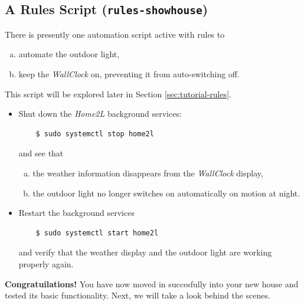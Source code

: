 \documentclass[12pt,english,parskip=half]{scrreprt}
\begin{document}
\subsection{A Rules Script (\texttt{rules-showhouse})}
\label{sec:tutorial-firststeps-rules}


There is presently one automation script active with rules to
\begin{enumerate}[a)]
\item
  automate the outdoor light,
\item
  keep the \emph{WallClock} on, preventing it from auto-switching off.
\end{enumerate}

This script will be explored later in Section \ref{sec:tutorial-rules}.

\begin{itemize}[$\blacktriangleright$]

\item
  Shut down the \emph{Home2L} background services:
  \begin{lstlisting}
    $ sudo systemctl stop home2l
  \end{lstlisting}
  and see that

  \begin{enumerate}[a)]
  \item
    the weather information disappears from the \emph{WallClock} display,
  \item
    the outdoor light no longer switches on automatically on motion at night.
  \end{enumerate}

\item
  Restart the background services
  \begin{lstlisting}
    $ sudo systemctl start home2l
  \end{lstlisting}
  and verify that the weather display and the outdoor light are working properly again.

\end{itemize}


\textbf{Congratuilations!} You have now moved in succesfully into your new house and
tested its basic functionality. Next, we will take a look behind the scenes.





\end{document}
